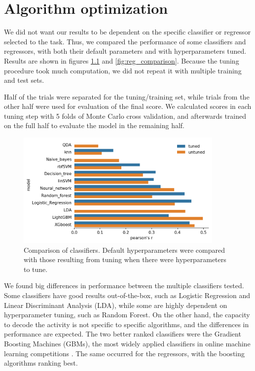 \chapter{Algorithm optimization}
\label{chap:opt}

We did not want our results to be dependent on the specific classifier or regressor selected to the task. Thus, we compared the performance of some classifiers and regressors, with both their default parameters and with hyperparameters tuned. Results are shown in figures \ref{fig:clf_comparison} and \ref{fig:reg_comparison}. Because the tuning procedure took much computation, we did not repeat it with multiple training and test sets.

Half of the trials were separated for the tuning/training set, while trials from the other half were used for evaluation of the final score. We calculated scores in each tuning step with 5 folds of Monte Carlo cross validation, and afterwards trained on the full half to evaluate the model in the remaining half.
    
\begin{figure}[ht]
        \centering
        \includegraphics[width=0.9\textwidth]{figures/plots/classifier_hyperopt.png}
        \caption[Comparison of classifiers]{Comparison of classifiers. Default hyperparameters were compared with those resulting from tuning when there were hyperparameters to tune.}
        \label{fig:clf_comparison}
\end{figure}

We found big differences in performance between the multiple classifiers tested. Some classifiers have good results out-of-the-box, such as Logistic Regression and Linear Discriminant Analysis (LDA), while some are highly dependent on hyperparameter tuning, such as Random Forest. On the other hand, the capacity to decode the activity is not specific to specific algorithms, and the differences in performance are expected. The two better ranked classifiers were the Gradient Boosting Machines (GBMs), the most widely applied classifiers in online machine learning competitions \cite{chen2016xgboost, ke2017lightgbm}. The same occurred for the regressors, with the boosting algorithms ranking best. 

